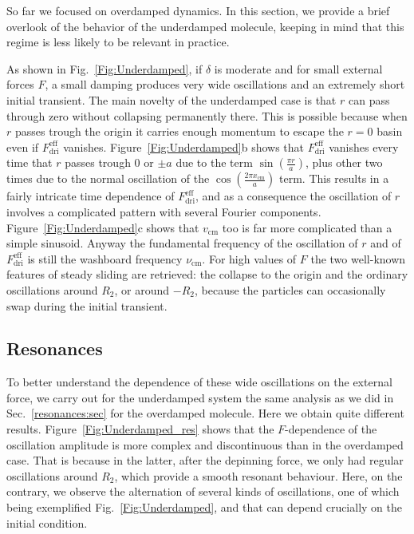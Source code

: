 So far we focused on overdamped dynamics. In this section, we provide a brief overlook of the behavior of the underdamped molecule, keeping in mind that this regime is less likely to be relevant in practice. 

As shown in Fig.~\ref{Fig:Underdamped}, if $\delta$ is moderate and for small external forces $F$, a small damping produces very wide oscillations and an extremely short initial transient. The main novelty of the underdamped case is that $r$ can pass through zero without collapsing permanently there. This is possible because when $r$ passes trough the origin it carries enough momentum to escape the $r=0$ basin even if $F_\text{dri}^\text{eff}$ vanishes. Figure~\ref{Fig:Underdamped}b shows that $F_\text{dri}^\text{eff}$ vanishes every time that $r$ passes trough $0$ or $\pm a$ due to the term $\sin\left(\frac{\pi r}{a}\right)$, plus other two times due to the normal oscillation of the $\cos\left(\frac{2\pi x_\text{cm}}{a}\right)$ term. This results in a fairly intricate time dependence of $F_\text{dri}^\text{eff}$, and as a consequence the oscillation of $r$ involves a complicated pattern with several Fourier components. Figure~\ref{Fig:Underdamped}c shows that $v_\text{cm}$ too is far more complicated than a simple sinusoid. Anyway the fundamental frequency of the oscillation of $r$ and of $F_\text{dri}^\text{eff}$ is still the washboard frequency $\nu_\text{cm}$. For high values of $F$ the two well-known features of steady sliding are retrieved: the collapse to the origin and the ordinary oscillations around $R_2$, or around $-R_2$, because the particles can occasionally swap during the initial transient.

\subsection{Resonances}
To  better understand the dependence of these wide oscillations on the external force, we carry out for the underdamped system the same analysis as we did in Sec.~\ref{resonances:sec} for the overdamped molecule. Here we obtain quite different results. Figure~\ref{Fig:Underdamped_res} shows that the $F$-dependence of the oscillation amplitude is more complex and discontinuous than in the overdamped case. That is because in the latter, after the depinning force, we only had regular oscillations around $R_2$, which provide a smooth resonant behaviour. Here, on the contrary, we observe the alternation of several kinds of oscillations, one of which being exemplified Fig.~\ref{Fig:Underdamped}, and that can depend crucially on the initial condition.

